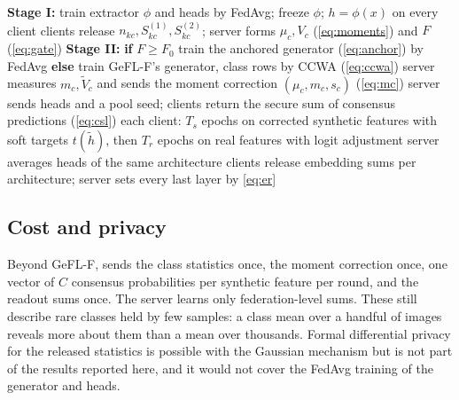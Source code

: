 \begin{algorithm}[t]
\caption{\ours (one run; all sums are computed by secure aggregation)}\label{alg:fedecs}
\begin{algorithmic}[1]
\State \textbf{Stage I:} train extractor $\phi$ and heads by FedAvg; freeze $\phi$; $h=\phi(x)$ on every client
\State clients release $n_{kc},S^{(1)}_{kc},S^{(2)}_{kc}$; server forms $\mu_c,V_c$ (\cref{eq:moments}) and $F$
(\cref{eq:gate})
\State \textbf{Stage II:} \textbf{if} $F\ge F_0$ train the anchored generator (\cref{eq:anchor}) by FedAvg
\textbf{else} train GeFL-F's generator, class rows by CCWA (\cref{eq:ccwa})
\State server measures $m_c,\tilde V_c$ and sends the moment correction $(\mu_c,m_c,s_c)$ (\cref{eq:mc})
 
  \State server sends heads and a pool seed; clients return the secure sum of consensus predictions (\cref{eq:csl})
  \State each client: $T_s$ epochs on corrected synthetic features with soft targets $t(\tilde h)$, then $T_r$ epochs on
  real features with logit adjustment
  \State server averages heads of the same architecture
\EndFor
\State clients release embedding sums per architecture; server sets every last layer by \cref{eq:er}
\end{algorithmic}
\end{algorithm}

\subsection{Cost and privacy}\label{sec:method-cost}

Beyond GeFL-F, \ours sends the class statistics once, the moment correction once, one vector of $C$ consensus
probabilities per synthetic feature per round, and the readout sums once.  The server learns only federation-level sums. These still describe rare
classes held by few samples: a class mean over a handful of images reveals more about them than a mean over thousands.
Formal differential privacy for the released statistics is possible with the Gaussian mechanism but is not part of the
results reported here, and it would not cover the FedAvg training of the generator and heads.
